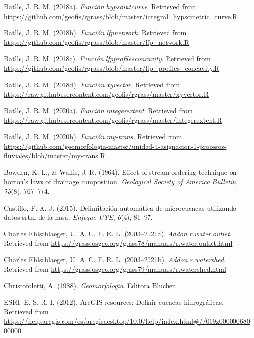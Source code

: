 \documentclass[11pt,]{article}
\begin{document}
\hypertarget{refs}{}
\hypertarget{ref-Hypsocjose}{}
Batlle, J. R. M. (2018a). \emph{Función hypsointcurve}. Retrieved from
\url{https://github.com/geofis/rgrass/blob/master/integral_hypsometric_curve.R}

\hypertarget{ref-lfpnetjose}{}
Batlle, J. R. M. (2018b). \emph{Función lfpnetwork}. Retrieved from
\url{https://github.com/geofis/rgrass/blob/master/lfp_network.R}

\hypertarget{ref-lfpconcajose}{}
Batlle, J. R. M. (2018c). \emph{Función lfpprofilesconcavity}. Retrieved
from
\url{https://github.com/geofis/rgrass/blob/master/lfp_profiles_concavity.R}

\hypertarget{ref-xyvector}{}
Batlle, J. R. M. (2018d). \emph{Función xyvector}. Retrieved from
\url{https://raw.githubusercontent.com/geofis/rgrass/master/xyvector.R}

\hypertarget{ref-intext}{}
Batlle, J. R. M. (2020a). \emph{Función integerextent}. Retrieved from
\url{https://raw.githubusercontent.com/geofis/rgrass/master/integerextent.R}

\hypertarget{ref-Mytransjose}{}
Batlle, J. R. M. (2020b). \emph{Función my-trans}. Retrieved from
\url{https://github.com/geomorfologia-master/unidad-4-asignacion-1-procesos-fluviales/blob/master/my-trans.R}

\hypertarget{ref-bowden1964effect}{}
Bowden, K. L., \& Wallis, J. R. (1964). Effect of stream-ordering
technique on horton's laws of drainage composition. \emph{Geological
Society of America Bulletin}, \emph{75}(8), 767--774.

\hypertarget{ref-castillo2015delimitacion}{}
Castillo, F. A. J. (2015). Delimitación automática de microcuencas
utilizando datos srtm de la nasa. \emph{Enfoque UTE}, \emph{6}(4),
81--97.

\hypertarget{ref-wateroutlet}{}
Charles Ehlschlaeger, U. A. C. E. R. L. (2003--2021a). \emph{Addon
r.water.outlet}. Retrieved from
\url{https://grass.osgeo.org/grass78/manuals/r.water.outlet.html}

\hypertarget{ref-watershedcharles}{}
Charles Ehlschlaeger, U. A. C. E. R. L. (2003--2021b). \emph{Addon
r.watershed}. Retrieved from
\url{https://grass.osgeo.org/grass79/manuals/r.watershed.html}

\hypertarget{ref-christofoletti1988geomorfologia}{}
Christofoletti, A. (1988). \emph{Geomorfologia}. Editora Blucher.

\hypertarget{ref-ESRI2012}{}
ESRI, E. S. R. I. (2012). ArcGIS resources: Definir cuencas
hidrográficas. Retrieved from
\url{https://help.arcgis.com/es/arcgisdesktop/10.0/help/index.html\#//009z00000068000000}
\end{document}

